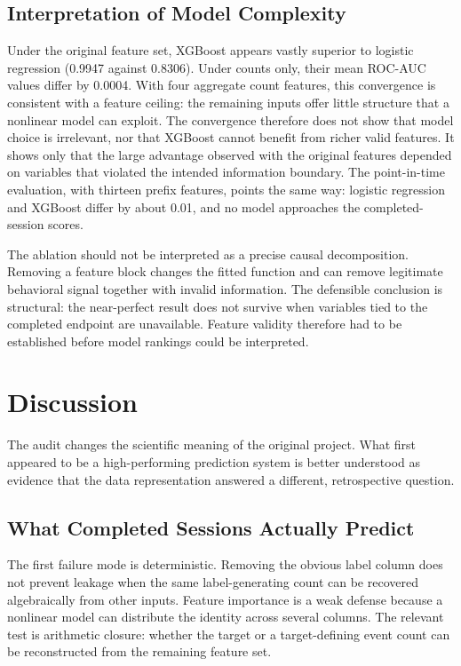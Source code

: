 \documentclass[conference, letterpaper]{IEEEtran}
\begin{document}
\subsection{Interpretation of Model Complexity}
Under the original feature set, XGBoost appears vastly superior to logistic regression (0.9947 against 0.8306). Under counts only, their mean ROC-AUC values differ by 0.0004. With four aggregate count features, this convergence is consistent with a feature ceiling: the remaining inputs offer little structure that a nonlinear model can exploit. The convergence therefore does not show that model choice is irrelevant, nor that XGBoost cannot benefit from richer valid features. It shows only that the large advantage observed with the original features depended on variables that violated the intended information boundary. The point-in-time evaluation, with thirteen prefix features, points the same way: logistic regression and XGBoost differ by about 0.01, and no model approaches the completed-session scores.

The ablation should not be interpreted as a precise causal decomposition. Removing a feature block changes the fitted function and can remove legitimate behavioral signal together with invalid information. The defensible conclusion is structural: the near-perfect result does not survive when variables tied to the completed endpoint are unavailable. Feature validity therefore had to be established before model rankings could be interpreted.

\section{Discussion}
The audit changes the scientific meaning of the original project. What first appeared to be a high-performing prediction system is better understood as evidence that the data representation answered a different, retrospective question.

\subsection{What Completed Sessions Actually Predict}
The first failure mode is deterministic. Removing the obvious label column does not prevent leakage when the same label-generating count can be recovered algebraically from other inputs. Feature importance is a weak defense because a nonlinear model can distribute the identity across several columns. The relevant test is arithmetic closure: whether the target or a target-defining event count can be reconstructed from the remaining feature set.
\end{document}

